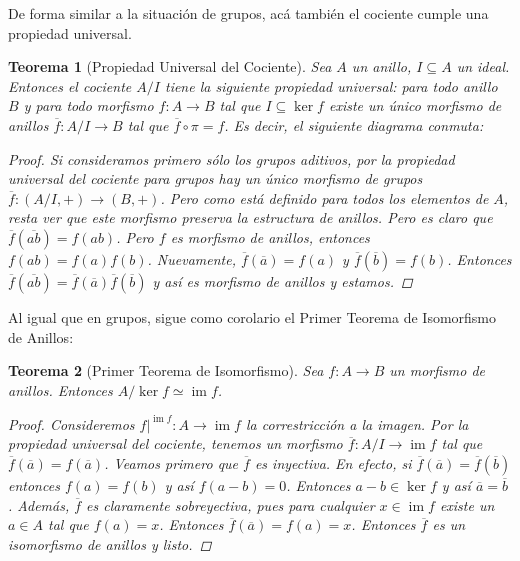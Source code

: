 \documentclass[12pt]{book}
\newtheorem{teo}{Teorema}[section]
\theoremstyle{definition}
\DeclareMathOperator{\im}{im}
\begin{document}
De forma similar a la situación de grupos, acá también el cociente cumple una propiedad universal.

\begin{teo}[Propiedad Universal del Cociente]

Sea $A$ un anillo, $I\subseteq A$ un ideal. Entonces el cociente $A/I$ tiene la siguiente propiedad universal: para todo anillo $B$ y para todo morfismo $f:A\to B$ tal que $I\subseteq \ker f$ existe un único morfismo de anillos $\overline{f}:A/I\to B$ tal que $\overline{f}\circ \pi = f$. Es decir, el siguiente diagrama conmuta:


\begin{proof}
Si consideramos primero sólo los grupos aditivos, por la propiedad universal del cociente para grupos hay un único morfismo de grupos $\overline{f}:(A/I,+) \to (B,+)$. Pero como está definido para todos los elementos de $A$, resta ver que este morfismo preserva la estructura de anillos. Pero es claro que $\overline{f}(\overline{ab}) = f(ab)$. Pero $f$ es morfismo de anillos, entonces $f(ab)=f(a)f(b)$. Nuevamente, $\overline{f}(\overline{a})=f(a)$ y $\overline{f}(\overline{b})=f(b)$. Entonces $\overline{f}(\overline{ab})=\overline{f}(\overline{a})\overline{f}(\overline{b})$ y así es morfismo de anillos y estamos.
\end{proof}
\end{teo}

Al igual que en grupos, sigue como corolario el Primer Teorema de Isomorfismo de Anillos:

\begin{teo}[Primer Teorema de Isomorfismo]
Sea $f:A\to B$ un morfismo de anillos. Entonces $A/\ker f \simeq \im f$.
\begin{proof}
Consideremos $\left.f\right |^{\im f} : A\to \im f$ la correstricción a la imagen. Por la propiedad universal del cociente, tenemos un morfismo $\overline{f}:A/I\to \im f$ tal que $\overline{f}(\overline{a})=f(\overline{a})$. Veamos primero que $\overline{f}$ es inyectiva. En efecto, si $\overline{f}(\overline{a})=\overline{f}(\overline{b})$ entonces $f(a)=f(b)$ y así $f(a-b)=0$. Entonces $a-b\in \ker f$ y así $\overline{a}=\overline{b}$. Además, $\overline{f}$ es claramente sobreyectiva, pues para cualquier $x\in \im f$ existe un $a\in A$ tal que $f(a)=x$. Entonces $\overline{f}(\overline{a})=f(a)=x$. Entonces $\overline{f}$ es un isomorfismo de anillos y listo.
\end{proof}
\end{teo}
\end{document}
